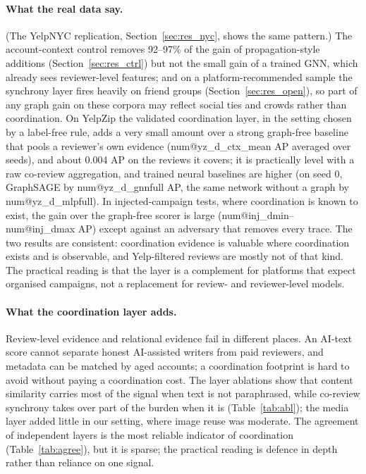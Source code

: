 \documentclass[pdflatex,sn-basic]{sn-jnl}
\makeatletter
\theoremstyle{thmstyleone}
\theoremstyle{thmstylethree}
\newcommand{\num}[1]{\csname num@#1\endcsname}
\makeatother
\begin{document}
\paragraph{What the real data say.} (The YelpNYC replication, Section~\ref{sec:res_nyc}, shows the same pattern.) The account-context control removes 92--97\% of the gain of propagation-style additions (Section~\ref{sec:res_ctrl}) but not the small gain of a trained GNN, which already sees reviewer-level features; and on a platform-recommended sample the synchrony layer fires heavily on friend groups (Section~\ref{sec:res_open}), so part of any graph gain on these corpora may reflect social ties and crowds rather than coordination. On YelpZip the validated coordination layer, in the setting chosen by a label-free rule, adds a very small amount over a strong graph-free baseline that pools a reviewer's own evidence (\num{yz_d_ctx_mean} AP averaged over seeds), and about 0.004 AP on the reviews it covers; it is practically level with a raw co-review aggregation, and trained neural baselines are higher (on seed 0, GraphSAGE by \num{yz_d_gnnfull} AP, the same network without a graph by \num{yz_d_mlpfull}). In injected-campaign tests, where coordination is known to exist, the gain over the graph-free scorer is large (\num{inj_dmin}--\num{inj_dmax} AP) except against an adversary that removes every trace. The two results are consistent: coordination evidence is valuable where coordination exists and is observable, and Yelp-filtered reviews are mostly not of that kind. The practical reading is that the layer is a complement for platforms that expect organised campaigns, not a replacement for review- and reviewer-level models.


\paragraph{What the coordination layer adds.} Review-level evidence and relational evidence fail in different places. An AI-text score cannot separate honest AI-assisted writers from paid reviewers, and metadata can be matched by aged accounts; a coordination footprint is hard to avoid without paying a coordination cost. The layer ablations show that content similarity carries most of the signal when text is not paraphrased, while co-review synchrony takes over part of the burden when it is (Table~\ref{tab:abl}); the media layer added little in our setting, where image reuse was moderate. The agreement of independent layers is the most reliable indicator of coordination (Table~\ref{tab:agree}), but it is sparse; the practical reading is defence in depth rather than reliance on one signal.
\end{document}
